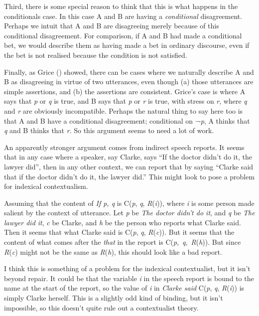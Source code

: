 \documentclass[
  11pt,
  letterpaper,
  DIV=11,
  numbers=noendperiod,
  twoside]{scrartcl}
\begin{document}
Third, there is some special reason to think that this is what happens
in the conditionals case. In this case A and B are having a
\emph{conditional} disagreement. Perhaps we intuit that A and B are
disagreeing merely because of this conditional disagreement. For
comparison, if A and B had made a conditional bet, we would describe
them as having made a bet in ordinary discourse, even if the bet is not
realised because the condition is not satisfied.

Finally, as Grice () showed, there can be
cases where we naturally describe A and B as disagreeing in virtue of
two utterances, even though (a) those utterances are simple assertions,
and (b) the assertions are consistent. Grice's case is where A says that
\emph{p} or \emph{q} is true, and B says that \emph{p} or \emph{r} is
true, with stress on \emph{r}, where \emph{q} and \emph{r} are obviously
incompatible. Perhaps the natural thing to say here too is that A and B
have a conditional disagreement; conditional on ¬\emph{p}, A thinks that
\emph{q} and B thinks that \emph{r}. So this argument seems to need a
lot of work.

An apparently stronger argument comes from indirect speech reports. It
seems that in any case where a speaker, say Clarke, says ``If the doctor
didn't do it, the lawyer did'', then in any other context, we can report
that by saying ``Clarke said that if the doctor didn't do it, the lawyer
did.'' This might look to pose a problem for indexical contextualism.

Assuming that the content of \emph{If p, q} is C(\emph{p}, \emph{q},
\emph{R}(\emph{i})), where \emph{i} is some person made salient by the
context of utterance. Let \emph{p} be \emph{The doctor didn't do it},
and \emph{q} be \emph{The lawyer did it}, \emph{c} be Clarke, and
\emph{h} be the person who reports what Clarke said. Then it seems that
what Clarke said is C(\emph{p}, \emph{q}, \emph{R}(\emph{c})). But it
seems that the content of what comes after the \emph{that} in the report
is C(\emph{p},~\emph{q},~\emph{R}(\emph{h})). But since
\emph{R}(\emph{c}) might not be the same as \emph{R}(\emph{h}), this
should look like a bad report.

I think this is something of a problem for the indexical contextualist,
but it isn't beyond repair. It could be that the variable \emph{i} in
the speech report is bound to the name at the start of the report, so
the value of \emph{i} in \emph{Clarke said} C(\emph{p}, \emph{q},
\emph{R}(\emph{i})) is simply Clarke herself. This is a slightly odd
kind of binding, but it isn't impossible, so this doesn't quite rule out
a contextualist theory.
\end{document}
